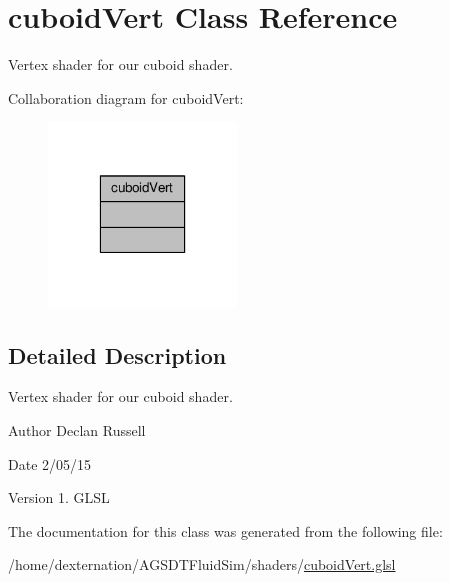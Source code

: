 \hypertarget{classcuboid_vert}{\section{cuboid\-Vert Class Reference}
\label{classcuboid_vert}
}


Vertex shader for our cuboid shader.  




Collaboration diagram for cuboid\-Vert\-:\nopagebreak
\begin{figure}[H]
\begin{center}
\leavevmode
\includegraphics[width=142pt]{classcuboid_vert__coll__graph}
\end{center}
\end{figure}


\subsection{Detailed Description}
Vertex shader for our cuboid shader. 

\begin{DoxyAuthor}{Author}
Declan Russell 
\end{DoxyAuthor}
\begin{DoxyDate}{Date}
2/05/15 
\end{DoxyDate}
\begin{DoxyVersion}{Version}
1.  G\-L\-S\-L 
\end{DoxyVersion}


The documentation for this class was generated from the following file\-:\begin{DoxyCompactItemize}
\item 
/home/dexternation/\-A\-G\-S\-D\-T\-Fluid\-Sim/shaders/\hyperlink{cuboid_vert_8glsl}{cuboid\-Vert.\-glsl}\end{DoxyCompactItemize}
